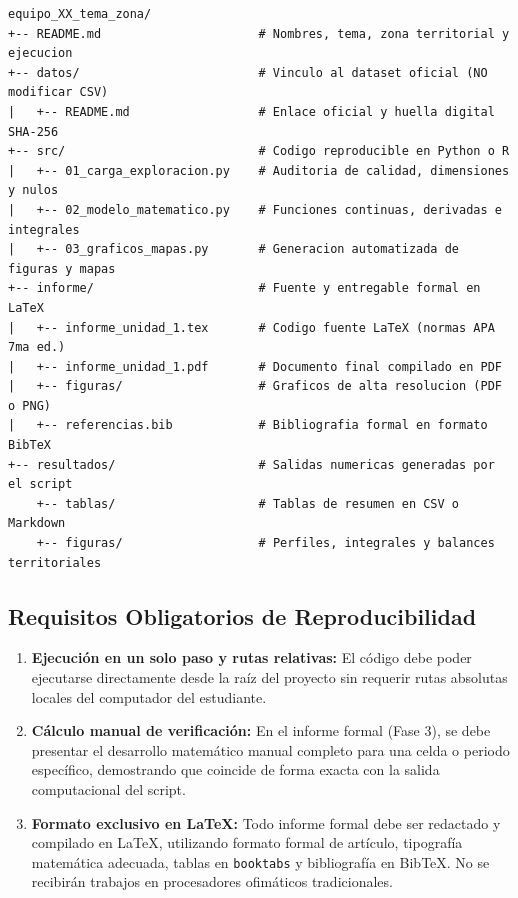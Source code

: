 \documentclass[11pt,a4paper]{article}
\begin{document}
\begin{examplebox}[title=Estructura Estándar de Carpetas por Equipo]
\begin{verbatim}
equipo_XX_tema_zona/
+-- README.md                      # Nombres, tema, zona territorial y ejecucion
+-- datos/                         # Vinculo al dataset oficial (NO modificar CSV)
|   +-- README.md                  # Enlace oficial y huella digital SHA-256
+-- src/                           # Codigo reproducible en Python o R
|   +-- 01_carga_exploracion.py    # Auditoria de calidad, dimensiones y nulos
|   +-- 02_modelo_matematico.py    # Funciones continuas, derivadas e integrales
|   +-- 03_graficos_mapas.py       # Generacion automatizada de figuras y mapas
+-- informe/                       # Fuente y entregable formal en LaTeX
|   +-- informe_unidad_1.tex       # Codigo fuente LaTeX (normas APA 7ma ed.)
|   +-- informe_unidad_1.pdf       # Documento final compilado en PDF
|   +-- figuras/                   # Graficos de alta resolucion (PDF o PNG)
|   +-- referencias.bib            # Bibliografia formal en formato BibTeX
+-- resultados/                    # Salidas numericas generadas por el script
    +-- tablas/                    # Tablas de resumen en CSV o Markdown
    +-- figuras/                   # Perfiles, integrales y balances territoriales
\end{verbatim}
\end{examplebox}

\subsection{Requisitos Obligatorios de Reproducibilidad}
\begin{enumerate}[leftmargin=*,itemsep=1.5pt]
  \item \textbf{Ejecución en un solo paso y rutas relativas:} El código debe poder ejecutarse directamente desde la raíz del proyecto sin requerir rutas absolutas locales del computador del estudiante.
  \item \textbf{Cálculo manual de verificación:} En el informe formal (Fase 3), se debe presentar el desarrollo matemático manual completo para una celda o periodo específico, demostrando que coincide de forma exacta con la salida computacional del script.
  \item \textbf{Formato exclusivo en \LaTeX{}:} Todo informe formal debe ser redactado y compilado en \LaTeX{}, utilizando formato formal de artículo, tipografía matemática adecuada, tablas en \texttt{booktabs} y bibliografía en BibTeX. No se recibirán trabajos en procesadores ofimáticos tradicionales.
\end{enumerate}
\end{document}
